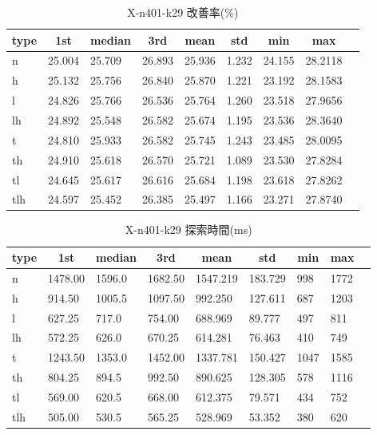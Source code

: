 \begin{table}[htbp]
    \caption{X-n401-k29 改善率(\%)}
    \begin{tabular}{|l|l|l|l|l|l|l|l|l|}\hline
    \multicolumn{1}{|c|}{\textbf{type}}
    &\multicolumn{1}{|c|}{\textbf{1st}}
    &\multicolumn{1}{c|}{\textbf{median}}
    &\multicolumn{1}{c|}{\textbf{3rd}}
    &\multicolumn{1}{c|}{\textbf{mean}}
    &\multicolumn{1}{c|}{\textbf{std}}
    &\multicolumn{1}{c|}{\textbf{min}}
    &\multicolumn{1}{c|}{\textbf{max}}\\\hline
	n & 25.004 & 25.709 & 26.893 & 25.936 & 1.232 & 24.155 & 28.2118\\\hline
	h & 25.132 & 25.756 & 26.840 & 25.870 & 1.221 & 23.192 & 28.1583\\\hline
	l & 24.826 & 25.766 & 26.536 & 25.764 & 1.260 & 23.518 & 27.9656\\\hline
	lh & 24.892 & 25.548 & 26.582 & 25.674 & 1.195 & 23.536 & 28.3640\\\hline
	t & 24.810 & 25.933 & 26.582 & 25.745 & 1.243 & 23.485 & 28.0095\\\hline
	th & 24.910 & 25.618 & 26.570 & 25.721 & 1.089 & 23.530 & 27.8284\\\hline
	tl & 24.645 & 25.617 & 26.616 & 25.684 & 1.198 & 23.618 & 27.8262\\\hline
	tlh & 24.597 & 25.452 & 26.385 & 25.497 & 1.166 & 23.271 & 27.8740\\\hline
	\end{tabular}
\end{table}
\begin{table}[htbp]
    \caption{X-n401-k29 探索時間(ms)}
    \begin{tabular}{|l|l|l|l|l|l|l|l|l|}\hline
    \multicolumn{1}{|c|}{\textbf{type}}
    &\multicolumn{1}{|c|}{\textbf{1st}}
    &\multicolumn{1}{c|}{\textbf{median}}
    &\multicolumn{1}{c|}{\textbf{3rd}}
    &\multicolumn{1}{c|}{\textbf{mean}}
    &\multicolumn{1}{c|}{\textbf{std}}
    &\multicolumn{1}{c|}{\textbf{min}}
    &\multicolumn{1}{c|}{\textbf{max}}\\\hline
	n & 1478.00 & 1596.0 & 1682.50 & 1547.219 & 183.729 & 998 & 1772\\\hline
	h & 914.50 & 1005.5 & 1097.50 & 992.250 & 127.611 & 687 & 1203\\\hline
	l & 627.25 & 717.0 & 754.00 & 688.969 & 89.777 & 497 & 811\\\hline
	lh & 572.25 & 626.0 & 670.25 & 614.281 & 76.463 & 410 & 749\\\hline
	t & 1243.50 & 1353.0 & 1452.00 & 1337.781 & 150.427 & 1047 & 1585\\\hline
	th & 804.25 & 894.5 & 992.50 & 890.625 & 128.305 & 578 & 1116\\\hline
	tl & 569.00 & 620.5 & 668.00 & 612.375 & 79.571 & 434 & 752\\\hline
	tlh & 505.00 & 530.5 & 565.25 & 528.969 & 53.352 & 380 & 620\\\hline
	\end{tabular}
\end{table}
